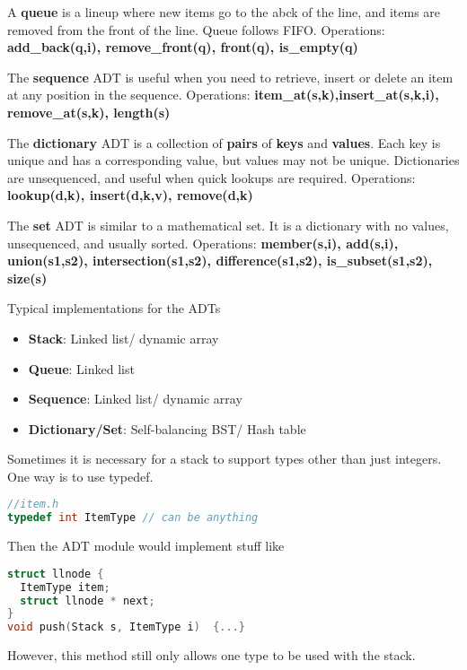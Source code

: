 \documentclass[english, 12pt]{article}
\begin{document}
\begin{defn}
A \textbf{queue} is a lineup where new items go to the abck of the line, and items are removed from the front of the line. Queue follows FIFO.\n
Operations: \textbf{add\_back(q,i), remove\_front(q), front(q), is\_empty(q)}
\end{defn}

\begin{defn}
The \textbf{sequence} ADT is useful when you need to retrieve, insert or delete an item at any position in the sequence. \n
Operations: \textbf{item\_at(s,k),insert\_at(s,k,i), remove\_at(s,k), length(s)}
\end{defn}

\begin{defn}
The \textbf{dictionary} ADT is a collection of \textbf{pairs} of \textbf{keys} and \textbf{values}. Each key is unique and has a corresponding value, but values may not be unique. Dictionaries are unsequenced, and useful when quick lookups are required.\n
Operations: \textbf{lookup(d,k), insert(d,k,v), remove(d,k)}
\end{defn}

\begin{defn}
The \textbf{set} ADT is similar to a mathematical set. It is a dictionary with no values, unsequenced, and usually sorted.\n
Operations: \textbf{member(s,i), add(s,i), union(s1,s2), intersection(s1,s2), difference(s1,s2), is\_subset(s1,s2), size(s)}
\end{defn}

\begin{note}
Typical implementations for the ADTs
\begin{itemize}
\item \textbf{Stack}: Linked list/ dynamic array
\item \textbf{Queue}: Linked list
\item \textbf{Sequence}: Linked list/ dynamic array
\item \textbf{Dictionary/Set}: Self-balancing BST/ Hash table
\end{itemize}
\end{note}

\begin{exmp}
Sometimes it is necessary for a stack to support types other than just integers. One way is to use typedef.
\begin{lstlisting}[language=C]
//item.h
typedef int ItemType // can be anything
\end{lstlisting}
Then the ADT module would implement stuff like
\begin{lstlisting}[language=C]
struct llnode {
  ItemType item;
  struct llnode * next;
}
void push(Stack s, ItemType i)  {...}
\end{lstlisting}
However, this method still only allows one type to be used with the stack.
\end{exmp}
\end{document}
